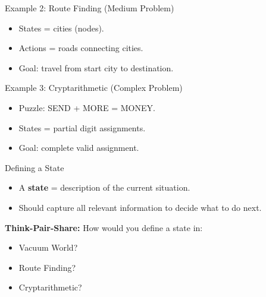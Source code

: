 \documentclass[aspectratio=169]{beamer}
\begin{document}
\begin{frame}{Example 2: Route Finding (Medium Problem)}
  \begin{minipage}{0.55\textwidth}
    \begin{itemize}
      \item States = cities (nodes).
      \item Actions = roads connecting cities.
      \item Goal: travel from start city to destination.
    \end{itemize}
  \end{minipage}%
  \begin{minipage}{0.43\textwidth}
  \end{minipage}
\end{frame}

\begin{frame}{Example 3: Cryptarithmetic (Complex Problem)}
  \begin{minipage}{0.55\textwidth}
    \begin{itemize}
      \item Puzzle: SEND + MORE = MONEY.
      \item States = partial digit assignments.
      \item Goal: complete valid assignment.
    \end{itemize}
  \end{minipage}%
  \begin{minipage}{0.43\textwidth}
  \end{minipage}
\end{frame}

\begin{frame}{Defining a State}
  \begin{itemize}
    \item A \textbf{state} = description of the current situation.
    \item Should capture all relevant information to decide what to do next.
  \end{itemize}
  \vspace{0.3cm}
  \textbf{Think-Pair-Share:} How would you define a state in:
  \begin{itemize}
    \item Vacuum World?
    \item Route Finding?
    \item Cryptarithmetic?
  \end{itemize}
\end{frame}
\end{document}
